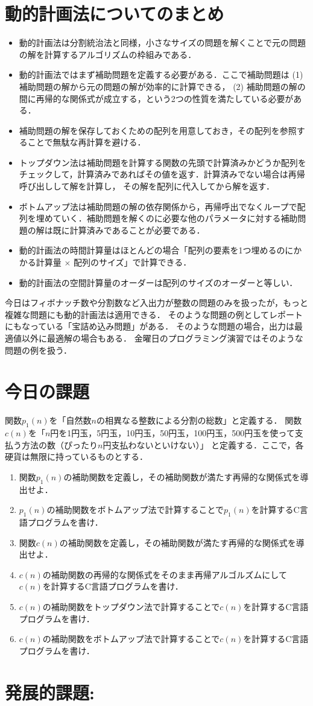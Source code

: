 \documentclass[a4paper,twoside,onecolumn,openany,article]{memoir}
\theoremstyle{remark}
\begin{document}
\section{動的計画法についてのまとめ}
\begin{itemize}
\item 動的計画法は分割統治法と同様，小さなサイズの問題を解くことで元の問題の解を計算するアルゴリズムの枠組みである．
\item 動的計画法ではまず補助問題を定義する必要がある．ここで補助問題は (1) 補助問題の解から元の問題の解が効率的に計算できる，
(2) 補助問題の解の間に再帰的な関係式が成立する，という2つの性質を満たしている必要がある．
\item 補助問題の解を保存しておくための配列を用意しておき，その配列を参照することで無駄な再計算を避ける．
\item トップダウン法は補助問題を計算する関数の先頭で計算済みかどうか配列をチェックして，計算済みであればその値を返す．計算済みでない場合は再帰呼び出しして解を計算し，
その解を配列に代入してから解を返す．
\item ボトムアップ法は補助問題の解の依存関係から，再帰呼出でなくループで配列を埋めていく．補助問題を解くのに必要な他のパラメータに対する補助問題の解は既に計算済みであることが必要である．
\item 動的計画法の時間計算量はほとんどの場合「配列の要素を1つ埋めるのにかかる計算量 $\times$ 配列のサイズ」で計算できる．
\item 動的計画法の空間計算量のオーダーは配列のサイズのオーダーと等しい．
\end{itemize}
今日はフィボナッチ数や分割数など入出力が整数の問題のみを扱ったが，もっと複雑な問題にも動的計画法は適用できる．
そのような問題の例としてレポートにもなっている「宝詰め込み問題」がある．
そのような問題の場合，出力は最適値以外に最適解の場合もある．
金曜日のプログラミング演習ではそのような問題の例を扱う．

\section{今日の課題}
関数$p_1(n)$を「自然数$n$の相異なる整数による分割の総数」と定義する．
関数$c(n)$を「$n$円を1円玉，5円玉，10円玉，50円玉，100円玉，500円玉を使って支払う方法の数（ぴったり$n$円支払わないといけない）」
と定義する．ここで，各硬貨は無限に持っているものとする．
\begin{enumerate}
\item 関数$p_1(n)$の補助関数を定義し，その補助関数が満たす再帰的な関係式を導出せよ．
\item $p_1(n)$の補助関数をボトムアップ法で計算することで$p_1(n)$を計算するC言語プログラムを書け．
\item 関数$c(n)$の補助関数を定義し，その補助関数が満たす再帰的な関係式を導出せよ．
\item $c(n)$の補助関数の再帰的な関係式をそのまま再帰アルゴルズムにして$c(n)$を計算するC言語プログラムを書け．
\item $c(n)$の補助関数をトップダウン法で計算することで$c(n)$を計算するC言語プログラムを書け．
\item $c(n)$の補助関数をボトムアップ法で計算することで$c(n)$を計算するC言語プログラムを書け．
\end{enumerate}

\section*{発展的課題:}
\end{document}
